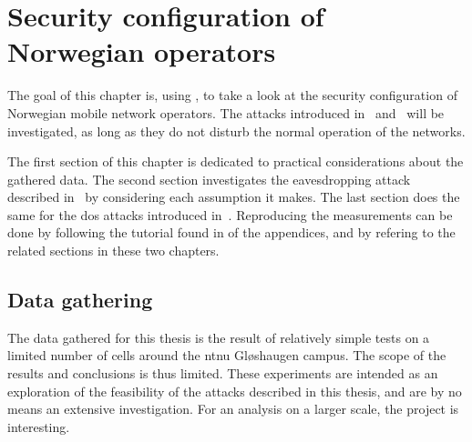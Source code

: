 \chapter{Security configuration of Norwegian operators}
\label{chap:security_configuration_of_norwegian_operators}

\iffalse

    Dev these
    attacks, test if it works! Insist on the product, no other
    publication gives this level of detail in the security of norwegian
    network. A bit in decoding gsm but almost nothing. try to explain
    the method and give it a nice name. about the method, talk about
    gsmmap and maybe analyze their method. how i tried to solve the pb
    and gather the data.

\fi

  The goal of this chapter is, using , to take a look at
  the security configuration of Norwegian mobile network operators. The
  attacks introduced in~
  and~ will be investigated, as long as they do
  not disturb the normal operation of the networks.

  The first section of this chapter is dedicated to practical
  considerations about the gathered data. The second section
  investigates the eavesdropping attack described
  in~ by considering each assumption it
  makes. The last section does the same for the \gls{dos} attacks
  introduced in~. Reproducing the measurements
  can be done by following the tutorial found in  of the
  appendices, and by refering to the related sections in these two
  chapters.


  \section{Data gathering}

    The data gathered for this thesis is the result of relatively simple
    tests on a limited number of cells around the \gls{ntnu} Gløshaugen
    campus. The scope of the results and conclusions is thus limited.
    These experiments are intended as an exploration of the feasibility
    of the attacks described in this thesis, and are by no means an
    extensive investigation. For an analysis on a larger scale, the
     project is interesting.

